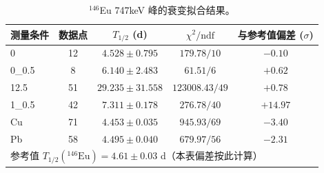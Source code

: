 \begin{table}[htbp]
  \centering
  \caption{$^{146}$Eu 747keV 峰的衰变拟合结果。}
  \label{tab:eu146-halflife-747kev}
  \begin{tabular}{lcccc}
    \hline
    测量条件 & 数据点 & $T_{1/2}$ (d) & $\chi^2/\mathrm{ndf}$ & 与参考值偏差 ($\sigma$) \\
    \hline
    0 & 12 & $4.528 \pm 0.795$ & $179.78/10$ & $-0.10$ \\
    0\_0.5 & 8 & $6.140 \pm 2.483$ & $61.51/6$ & $+0.62$ \\
    12.5 & 51 & $29.235 \pm 31.558$ & $123008.43/49$ & $+0.78$ \\
    1\_0.5 & 42 & $7.311 \pm 0.178$ & $276.78/40$ & $+14.97$ \\
    Cu & 71 & $4.453 \pm 0.035$ & $945.93/69$ & $-3.40$ \\
    Pb & 58 & $4.495 \pm 0.040$ & $679.97/56$ & $-2.31$ \\
    \hline
    \multicolumn{5}{l}{\footnotesize 参考值 $T_{1/2}(^{146}\mathrm{Eu}) = 4.61 \pm 0.03$ d（本表偏差按此计算）} \\
    \hline
  \end{tabular}
\end{table}
